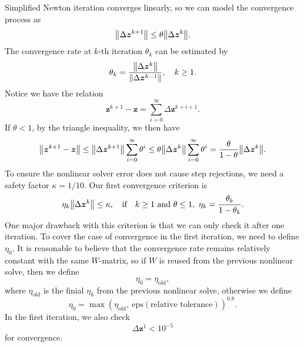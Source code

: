 \documentclass[a4paper,9pt]{article}
\theoremstyle{definition}
\theoremstyle{remark}
\begin{document}
Simplified Newton iteration converges linearly, so we can model the convergence
process as
\begin{equation}
  \norm{\Delta \bm{z}^{k+1}} \le \theta \norm{\Delta \bm{z}^{k}}.
\end{equation}
The convergence rate at $k$-th iteration $\theta_k$ can be estimated by
\begin{equation}
  \theta_k = \frac{\norm{\Delta\bm{z}^{k}}}{\norm{\Delta\bm{z}^{k-1}}},\quad k\ge 1.
\end{equation}
Notice we have the relation
\begin{equation}
  \bm{z}^{k+1} - \bm{z} = \sum_{i=0}^\infty \Delta\bm{z}^{k+i+1}.
\end{equation}
If $\theta<1$, by the triangle inequality, we then have
\begin{equation}
  \norm{\bm{z}^{k+1} - \bm{z}} \le
  \norm{\Delta\bm{z}^{k+1}}\sum_{i=0}^\infty \theta^i \le \theta
  \norm{\Delta\bm{z}^{k}}\sum_{i=0}^\infty \theta^i = \frac{\theta}{1-\theta}
  \norm{\Delta\bm{z}^{k}}.
\end{equation}
To ensure the nonlinear solver error does not cause step rejections, we need a
safety factor $\kappa = 1/10$. Our first convergence criterion is
\begin{equation}
  \eta_k \norm{\Delta\bm{z}^k} \le \kappa, \qq{if}
  k \ge 1 \text{ and } \theta \le 1, ~ \eta_k=\frac{\theta_k}{1-\theta_k}.
\end{equation}
One major drawback with this criterion is that we can only check it after one
iteration. To cover the case of convergence in the first iteration, we need to
define $\eta_0$. It is reasonable to believe that the convergence rate remains
relatively constant with the same $W$-matrix, so if $W$ is reused
 from the previous nonlinear solve,
then we define
\begin{equation}
  \eta_0 = \eta_{\text{old}},
\end{equation}
where $\eta_{\text{old}}$ is the finial $\eta_k$ from the previous nonlinear
solve, otherwise we define
\begin{equation}
  \eta_0 = \max(\eta_{\text{old}}, ~\text{eps}(\text{relative
  tolerance}))^{0.8}.
\end{equation}
In the first iteration, we also check
\begin{equation}
  \Delta\bm{z}^{1} < 10^{-5}
\end{equation}
for convergence. 
\end{document}
